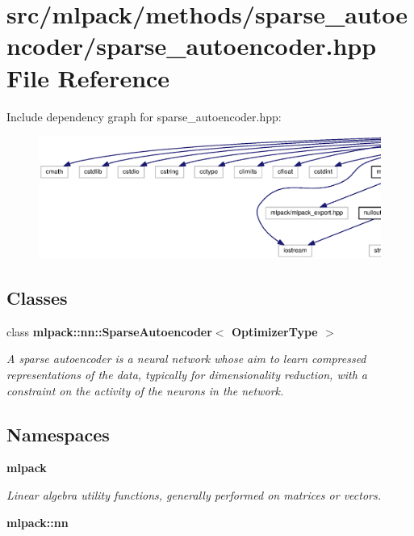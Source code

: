 \section{src/mlpack/methods/sparse\+\_\+autoencoder/sparse\+\_\+autoencoder.hpp File Reference}
\label{sparse__autoencoder_8hpp}
Include dependency graph for sparse\+\_\+autoencoder.\+hpp\+:
\nopagebreak
\begin{figure}[H]
\begin{center}
\leavevmode
\includegraphics[width=350pt]{sparse__autoencoder_8hpp__incl}
\end{center}
\end{figure}
\subsection*{Classes}
\begin{DoxyCompactItemize}
\item 
class {\bf mlpack\+::nn\+::\+Sparse\+Autoencoder$<$ Optimizer\+Type $>$}
\begin{DoxyCompactList}\small\item\em A sparse autoencoder is a neural network whose aim to learn compressed representations of the data, typically for dimensionality reduction, with a constraint on the activity of the neurons in the network. \end{DoxyCompactList}\end{DoxyCompactItemize}
\subsection*{Namespaces}
\begin{DoxyCompactItemize}
\item 
 {\bf mlpack}
\begin{DoxyCompactList}\small\item\em Linear algebra utility functions, generally performed on matrices or vectors. \end{DoxyCompactList}\item 
 {\bf mlpack\+::nn}
\end{DoxyCompactItemize}


